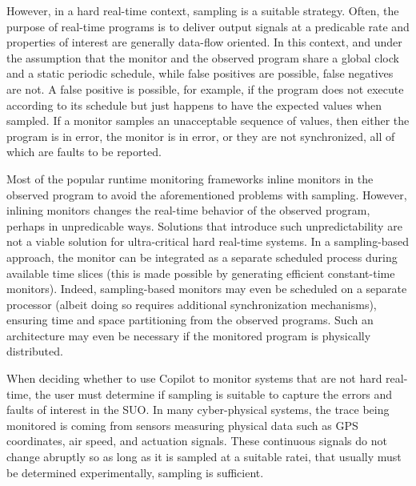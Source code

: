 However, in a hard real-time context, sampling is a suitable strategy.  Often,
the purpose of real-time programs is to deliver output signals at a predicable
rate and properties of interest are generally data-flow oriented.  In this
context, and under the assumption that the monitor and the observed program
share a global clock and a static periodic schedule, while false positives are
possible, false negatives are not.  A false positive is possible, for example,
if the program does not execute according to its schedule but just happens to
have the expected values when sampled.  If a monitor samples an unacceptable
sequence of values, then either the program is in error, the monitor is in
error, or they are not synchronized, all of which are faults to be reported.

Most of the popular runtime monitoring frameworks inline monitors in
the observed program to avoid the aforementioned problems with
sampling.  However, inlining monitors changes the real-time behavior
of the observed program, perhaps in unpredicable ways.
Solutions that
introduce such unpredictability are not a viable solution for
ultra-critical hard real-time systems.  In a sampling-based approach,
the monitor can be integrated as a separate scheduled process during
available time slices (this is made possible by generating efficient
constant-time monitors).  Indeed, sampling-based monitors may even be
scheduled on a separate processor (albeit doing so requires additional
synchronization mechanisms), ensuring time and space partitioning from
the observed programs.  Such an architecture may even be necessary if
the monitored program is physically distributed.

When deciding whether to use Copilot to monitor systems that are not hard real-time, the user must determine if
sampling is suitable to capture the errors and faults of interest in the  SUO. In many cyber-physical systems, the trace being monitored is
coming from sensors measuring physical data such as GPS coordinates, air speed, and actuation signals. These continuous signals do not
change abruptly so as long as it is sampled at a suitable ratei, that usually must be determined experimentally, sampling is sufficient.



